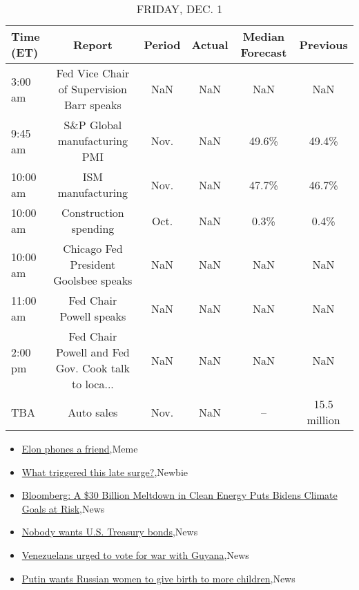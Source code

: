 \documentclass{article}%
\begin{document}
\begin{table}[htbp]%
\caption{FRIDAY, DEC. 1}%
\centering%
\begin{adjustbox}{width=1\textwidth}%
\begin{tabular}{lccccc}
\toprule
Time (ET) &                                             Report & Period & Actual & Median Forecast &     Previous \\
\midrule
  3:00 am &          Fed Vice Chair of Supervision Barr speaks &    NaN &    NaN &             NaN &          NaN \\
  9:45 am &                       S\&P Global manufacturing PMI &   Nov. &    NaN &           49.6\% &        49.4\% \\
 10:00 am &                                  ISM manufacturing &   Nov. &    NaN &           47.7\% &        46.7\% \\
 10:00 am &                              Construction spending &   Oct. &    NaN &            0.3\% &         0.4\% \\
 10:00 am &              Chicago Fed President Goolsbee speaks &    NaN &    NaN &             NaN &          NaN \\
 11:00 am &                            Fed Chair Powell speaks &    NaN &    NaN &             NaN &          NaN \\
  2:00 pm & Fed Chair Powell and Fed Gov. Cook talk to loca... &    NaN &    NaN &             NaN &          NaN \\
      TBA &                                         Auto sales &   Nov. &    NaN &              -- & 15.5 million \\
\bottomrule
\end{tabular}
%
\end{adjustbox}%
\end{table}

%
\begin{itemize}%
\item%
\href{https://reddit.com/r/wallstreetbets/comments/1884rxo/elon\_phones\_a\_friend/}{Elon phones a friend},Meme%
\item%
\href{https://reddit.com/r/StockMarket/comments/1880rmj/what\_triggered\_this\_late\_surge/}{What triggered this late surge?},Newbie%
\item%
\href{https://reddit.com/r/StockMarket/comments/187h7ls/bloomberg\_a\_30\_billion\_meltdown\_in\_clean\_energy/}{Bloomberg: A \$30 Billion Meltdown in Clean Energy Puts Bidens Climate Goals at Risk},News%
\item%
\href{https://reddit.com/r/Economics/comments/1882ss5/nobody\_wants\_us\_treasury\_bonds/}{Nobody wants U.S. Treasury bonds},News%
\item%
\href{https://reddit.com/r/Economics/comments/187y2qn/venezuelans\_urged\_to\_vote\_for\_war\_with\_guyana/}{Venezuelans urged to vote for war with Guyana},News%
\item%
\href{https://reddit.com/r/Economics/comments/187xuty/putin\_wants\_russian\_women\_to\_give\_birth\_to\_more/}{Putin wants Russian women to give birth to more children},News%
\end{itemize}%
\end{document}
